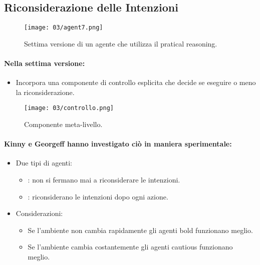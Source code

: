\pagebreak
\subsection{Riconsiderazione delle Intenzioni}

\begin{figure}[!h]
    \centering
    \texttt{[image: 03/agent7.png]}
  \caption{Settima versione di un agente che utilizza il pratical reasoning.}
\end{figure}

\paragraph{Nella settima versione:}

\begin{itemize}
  \item Incorpora una componente di controllo esplicita  che decide se eseguire o meno la riconsiderazione. 
\end{itemize}

\begin{figure}[!h]
    \centering
    \texttt{[image: 03/controllo.png]}
  \caption{Componente meta-livello.}
\end{figure}


\paragraph{Kinny e Georgeff hanno investigato ciò in maniera sperimentale:}

\begin{itemize}
  \item Due tipi di agenti: 
    \begin{itemize}
      \item {}: non si fermano mai a riconsiderare le intenzioni. 
      \item {}: riconsiderano le intenzioni dopo ogni azione.
    \end{itemize}
  \item Considerazioni:
    \begin{itemize}
      \item Se l'ambiente non cambia rapidamente gli agenti bold funzionano meglio. 
      \item Se l'ambiente cambia costantemente gli agenti cautious funzionano meglio.
    \end{itemize}
\end{itemize}

